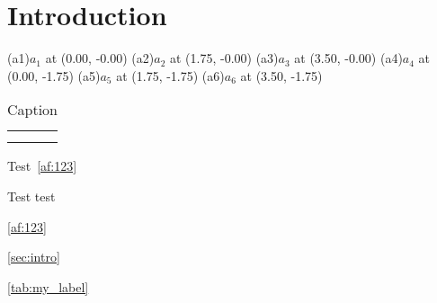 \documentclass[]{article}
\begin{document}
\begin{af}
    
\end{af}

\section{Introduction}\label{sec:intro}

\begin{af}
	\argument[](a1){$a_{1}$} at (0.00, -0.00)
	\argument[](a2){$a_{2}$} at (1.75, -0.00)
	\argument[](a3){$a_{3}$} at (3.50, -0.00)
	\argument[](a4){$a_{4}$} at (0.00, -1.75)
	\argument[](a5){$a_{5}$} at (1.75, -1.75)
	\argument[](a6){$a_{6}$} at (3.50, -1.75)
    \label{af:123}
\end{af}

\begin{table}[ht]
    \centering
    \begin{tabular}{c|c}
         &  \\
         & 
    \end{tabular}
    \caption{Caption}
    \label{tab:my_label}
\end{table}

Test~\ref{af:123}

Test  test

\autoref{af:123}

\autoref{sec:intro}

\autoref{tab:my_label}
\end{document}

